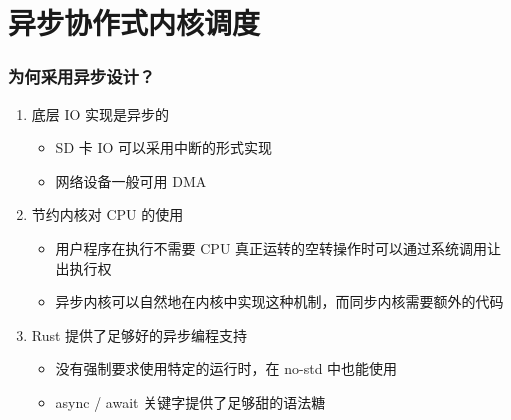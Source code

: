 \section{异步协作式内核调度}

\begin{frame}
    \frametitle{为何采用异步设计？}

    \begin{enumerate}
        \item 底层 IO 实现是异步的
              \begin{itemize}
                  \item SD 卡 IO 可以采用中断的形式实现
                  \item 网络设备一般可用 DMA
              \end{itemize}
        \item 节约内核对 CPU 的使用
              \begin{itemize}
                  \item 用户程序在执行不需要 CPU 真正运转的空转操作时可以通过系统调用让出执行权
                  \item 异步内核可以自然地在内核中实现这种机制，而同步内核需要额外的代码
              \end{itemize}
        \item Rust 提供了足够好的异步编程支持
              \begin{itemize}
                  \item 没有强制要求使用特定的运行时，在 no-std 中也能使用
                  \item async / await 关键字提供了足够甜的语法糖
              \end{itemize}
    \end{enumerate}
\end{frame}

